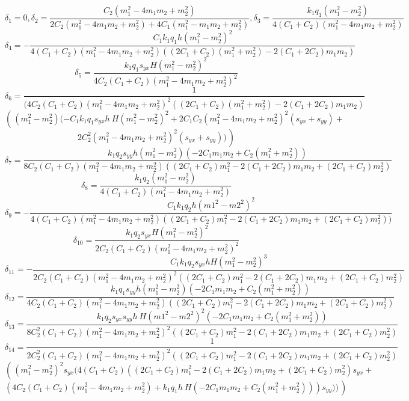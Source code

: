 \begin{small}
\[
\delta_1=0
,
\delta_2=\frac{C_2 (m_1^2 - 4 m_1 m_2 + m_2^2)}{
	2 C_2 (m_1^2 - 4 m_1 m_2 + m_2^2) + 4 C_1 (m_1^2 - m_1 m_2 + m_2^2)}
,
\delta_3=\frac{k_1 q_1(m_1^2 - m_2^2)}{4 (C_1 + C_2) (m_1^2 - 4 m_1 m_2 + m_2^2)}
\]
\[
\delta_4=-\frac{C_1  k_1 q_1 h(m_1^2 - m_2^2)^2 }{
	4 (C_1 + C_2) (m_1^2 - 4 m_1 m_2 + m_2^2) ((2 C_1 + C_2)(m_1^2+m_2^2) - 
	2 (C_1 + 2 C_2) m_1 m_2 )}
\]
\[
\delta_5=\frac{k_1 q_1 s_{yx} H(m_1^2 - m_2^2)^2}{4 C_2 (C_1 + C_2) (m_1^2 - 4 m_1 m_2 + 
	m_2^2)^2}
\]
\[
\delta_6=\frac{1}{(4 C_2 (C_1 + 
	C_2) (m_1^2 - 4 m_1 m_2 + m_2^2)^2 ((2 C_1 + C_2) (m_1^2+ m_2^2)- 
	2 (C_1 + 2 C_2) m_1 m_2  )}
\]
\[
\left(\frac{}{}
(m_1^2 - m_2^2) (-C_1  k_1 q_1 s_{yx} h~ H(m_1^2 - m_2^2)^2  + 
2 C_1 C_2 (m_1^2 - 4 m_1 m_2 + m_2^2)^2 (s_{yx} + s_{yy}) +\right.
\]
\[
\left. 
2 C_2^2 (m_1^2 - 4 m_1 m_2 + m_2^2)^2 (s_{yx} + s_{yy}))\frac{}{}\right)
\]
\[
\delta_7=\frac{k_1 q_2 s_{yy} h (m_1^2 - m_2^2)  (-2 C_1 m_1 m_2 + 
	C_2 (m_1^2 + m_2^2))}{8 C_2 (C_1 + C_2) (m_1^2 - 4 m_1 m_2 + 
	m_2^2) ((2 C_1 + C_2) m_1^2 - 2 (C_1 + 2 C_2) m_1 m_2 + (2 C_1 + C_2) m_2^2)}
\]
\[
\delta_8=\frac{k_1 q_2 (m_1^2 - m_2^2) }{4 (C_1 + C_2) (m_1^2 - 4 m_1 m_2 + m_2^2)}
\]
\[
\delta_9=-\frac{C_1  k_1  q_2 h(m1^2 - m2^2)^2}{
	4 (C_1 + C_2) (m_1^2 - 4 m_1 m_2 + m_2^2) ((2 C_1 + C_2) m_1^2 - 
	2 (C_1 + 2 C_2) m_1 m_2 + (2 C_1 + C_2) m_2^2))}
\]
\[
\delta_{10}=\frac{ k_1 q_2 s_{yx} H (m_1^2 - m_2^2)^2}{2 C_2 (C_1 + C_2) (m_1^2 - 4 m_1 m_2 + 
	m_2^2)^2}
\]
\[
\delta_{11}=-\frac{C_1  k_1 q_2 s_{yx} h H(m_1^2 - m_2^2)^3 }{
	2 C_2 (C_1 + C_2) (m_1^2 - 4 m_1 m_2 + m_2^2)^2 ((2 C_1 + C_2) m_1^2 - 
	2 (C_1 + 2 C_2) m_1 m_2 + (2 C_1 + C_2) m_2^2)}
\]
\[
\delta_{12}=\frac{k_1 q_1 s_{yy} h  (m_1^2 - m_2^2) (-2 C_1 m_1 m_2 + 
	C_2 (m_1^2 + m_2^2)) }{4 C_2 (C_1 + C_2) (m_1^2 - 4 m_1 m_2 + 
	m_2^2) ((2 C_1 + C_2) m_1^2 - 2 (C_1 + 2 C_2) m_1 m_2 + (2 C_1 + C_2) m_2^2)}
\]
\[
\delta_{13}=\frac{ k_1 q_2 s_{yx} s_{yy} h~ H(m1^2 - m2^2)^2  (-2 C_1 m_1 m_2 + 
	C_2 (m_1^2 + m_2^2)) }{8 C_2^2 (C_1 + C_2) (m_1^2 - 4 m_1 m_2 + 
	m_2^2)^2 ((2 C_1 + C_2) m_1^2 - 2 (C_1 + 2 C_2) m_1 m_2 + (2 C_1 + C_2) m_2^2)}
\]
\[
\delta_{14}=\frac{1}{2 C_2^2 (C_1 + C_2) (m_1^2 - 
	4 m_1 m_2 + m_2^2)^2 ((2 C_1 + C_2) m_1^2 - 
	2 (C_1 + 2 C_2) m_1 m_2 + (2 C_1 + C_2) m_2^2)}
\]
\[
\left( \frac{}{} (m_1^2 - m_2^2)^2  s_{yx} (4 (C_1 + C_2) ((2 C_1 + C_2) m_1^2 - 
2 (C_1 + 2 C_2) m_1 m_2 + (2 C_1 + C_2) m_2^2) s_{yx} + \right.
\]
\[
\left. (4 C_2 (C_1 + 
C_2) (m_1^2 - 4 m_1 m_2 + m_2^2) +
k_1 q_1 h~ H(-2 C_1 m_1 m_2 + C_2 (m_1^2 + m_2^2)) ) s_{yy}))\frac{}{}\right)
\]
\[
\]
\end{small}
